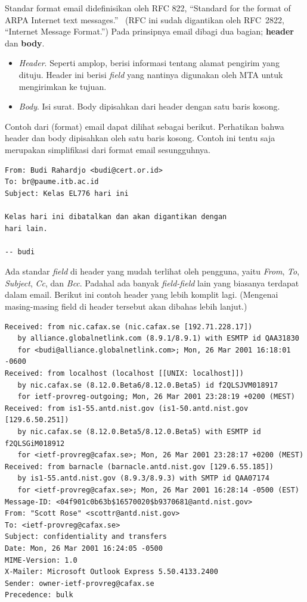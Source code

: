 Standar format email didefinisikan oleh RFC 822, ``Standard for the format of
ARPA Internet text messages.''~\cite{rfc822} (RFC ini sudah digantikan oleh
RFC~2822, ``Internet Message Format.'') Pada prinsipnya email dibagi dua
bagian; {\bf header} dan {\bf body}.

\begin{itemize}
   \item {\em Header}. Seperti amplop, berisi informasi tentang alamat pengirim
      yang dituju. Header ini berisi {\em field} yang nantinya digunakan oleh
      MTA untuk mengirimkan ke tujuan.
   \item {\em Body}. Isi surat. Body dipisahkan dari header dengan satu baris
      kosong. 
\end{itemize}

Contoh dari (format) email dapat dilihat sebagai berikut. Perhatikan bahwa
header dan body dipisahkan oleh satu baris kosong. Contoh ini tentu saja
merupakan simplifikasi dari format email sesungguhnya.

\begin{mdframed}
\begin{verbatim}
From: Budi Rahardjo <budi@cert.or.id>
To: br@paume.itb.ac.id
Subject: Kelas EL776 hari ini

Kelas hari ini dibatalkan dan akan digantikan dengan
hari lain.

-- budi
\end{verbatim}
\end{mdframed}

Ada standar {\em field} di header yang mudah terlihat oleh pengguna, yaitu {\em
From}, {\em To}, {\em Subject}, {\em Cc}, dan {\em Bcc}. Padahal ada banyak
{\em field-field} lain yang biasanya terdapat dalam email. Berikut ini contoh
header yang lebih komplit lagi. (Mengenai masing-masing field di header
tersebut akan dibahas lebih lanjut.)

\begin{mdframed}
\begin{verbatim}
Received: from nic.cafax.se (nic.cafax.se [192.71.228.17])
   by alliance.globalnetlink.com (8.9.1/8.9.1) with ESMTP id QAA31830
   for <budi@alliance.globalnetlink.com>; Mon, 26 Mar 2001 16:18:01 -0600
Received: from localhost (localhost [[UNIX: localhost]])
   by nic.cafax.se (8.12.0.Beta6/8.12.0.Beta5) id f2QLSJVM018917
   for ietf-provreg-outgoing; Mon, 26 Mar 2001 23:28:19 +0200 (MEST)
Received: from is1-55.antd.nist.gov (is1-50.antd.nist.gov [129.6.50.251])
   by nic.cafax.se (8.12.0.Beta5/8.12.0.Beta5) with ESMTP id f2QLSGiM018912
   for <ietf-provreg@cafax.se>; Mon, 26 Mar 2001 23:28:17 +0200 (MEST)
Received: from barnacle (barnacle.antd.nist.gov [129.6.55.185])
   by is1-55.antd.nist.gov (8.9.3/8.9.3) with SMTP id QAA07174
   for <ietf-provreg@cafax.se>; Mon, 26 Mar 2001 16:28:14 -0500 (EST)
Message-ID: <04f901c0b63b$16570020$b9370681@antd.nist.gov>
From: "Scott Rose" <scottr@antd.nist.gov>
To: <ietf-provreg@cafax.se>
Subject: confidentiality and transfers
Date: Mon, 26 Mar 2001 16:24:05 -0500
MIME-Version: 1.0
X-Mailer: Microsoft Outlook Express 5.50.4133.2400
Sender: owner-ietf-provreg@cafax.se
Precedence: bulk
\end{verbatim}
\end{mdframed}

